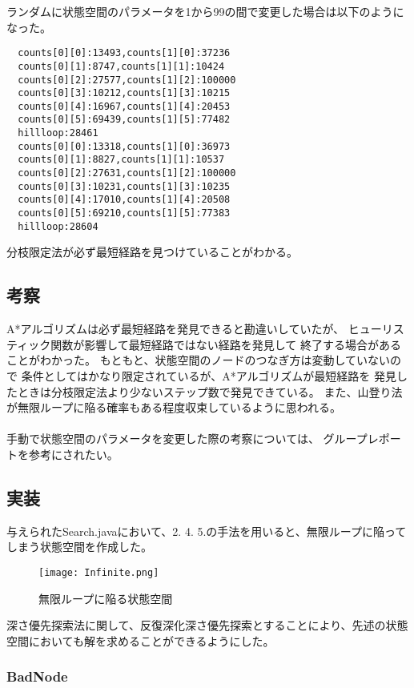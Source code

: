 \documentclass{jarticle}
\begin{document}
ランダムに状態空間のパラメータを1から99の間で変更した場合は以下のようになった。

\begin{lstlisting}
  counts[0][0]:13493,counts[1][0]:37236
  counts[0][1]:8747,counts[1][1]:10424
  counts[0][2]:27577,counts[1][2]:100000
  counts[0][3]:10212,counts[1][3]:10215
  counts[0][4]:16967,counts[1][4]:20453
  counts[0][5]:69439,counts[1][5]:77482
  hillloop:28461
  counts[0][0]:13318,counts[1][0]:36973
  counts[0][1]:8827,counts[1][1]:10537
  counts[0][2]:27631,counts[1][2]:100000
  counts[0][3]:10231,counts[1][3]:10235
  counts[0][4]:17010,counts[1][4]:20508
  counts[0][5]:69210,counts[1][5]:77383
  hillloop:28604
\end{lstlisting}

分枝限定法が必ず最短経路を見つけていることがわかる。

\subsection{考察}
A*アルゴリズムは必ず最短経路を発見できると勘違いしていたが、
ヒューリスティック関数が影響して最短経路ではない経路を発見して
終了する場合があることがわかった。
もともと、状態空間のノードのつなぎ方は変動していないので
条件としてはかなり限定されているが、A*アルゴリズムが最短経路を
発見したときは分枝限定法より少ないステップ数で発見できている。
また、山登り法が無限ループに陥る確率もある程度収束しているように思われる。
\paragraph{}
手動で状態空間のパラメータを変更した際の考察については、
グループレポートを参考にされたい。

\subsection{実装}
与えられたSearch.javaにおいて、2. 4. 5.の手法を用いると、無限ループに陥ってしまう状態空間を作成した。
\begin{figure}[htbp]
  \centering
  \texttt{[image: Infinite.png]}
  \caption{無限ループに陥る状態空間}
\end{figure}


深さ優先探索法に関して、反復深化深さ優先探索とすることにより、先述の状態空間においても解を求めることができるようにした。
\subsubsection{BadNode}
\end{document}
